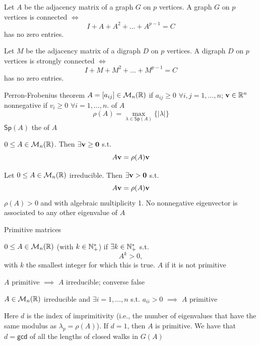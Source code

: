 \documentclass[aspectratio=43]{beamer}
\begin{document}
\begin{frame}
	\begin{theorem}
		Let $A$ be the adjacency matrix of a graph $G$ on $p$ vertices. 
		A graph $G$ on $p$ vertices is connected $\iff$ $$I+A+A^2+\dots+A^{p-1}=C$$
		has no zero entries.
	\end{theorem}
	\begin{theorem}
		Let $M$ be the adjacency matrix of a digraph $D$ on $p$ vertices. 
		A digraph $D$ on $p$ vertices is strongly connected $\iff$ $$I+M+M^2+\dots+M^{p-1}=C$$
		has no zero entries.
	\end{theorem}
\end{frame}


\begin{frame}{Perron-Frobenius theorem}
\vfill
$A=[a_{ij}]\in\mathcal{M}_n(\mathbb{R})$  if $a_{ij}\geq 0$ $\forall i,j=1,\ldots,n$; $\mathbf{v}\in\mathbb{R}^n$ nonnegative if $v_i\geq 0$ $\forall i=1,\ldots,n$.   of $A$
\[
\rho(A) = \max_{\lambda\in\mathsf{Sp}(A)}\{|\lambda|\}
\]
$\mathsf{Sp}(A)$ the  of $A$
\vfill
\begin{theorem}
$0\leq A\in\mathcal{M}_n(\mathbb{R})$. Then $\exists\bv\geq\b0$ s.t. 
\[
	A\mathbf{v}=\rho(A)\mathbf{v}
\]
\end{theorem}
\vfill

\begin{theorem}
	\label{th:PF}
	Let $0\leq A\in \mathcal{M}_n(\mathbb{R})$ irreducible. Then $\exists\bv>\b0$ s.t.
	\[
		A\mathbf{v}=\rho(A)\mathbf{v}
	\]
	$\rho(A)>0$ and with algebraic multiplicity 1.
	No nonnegative eigenvector is associated to any other eigenvalue of $A$
\end{theorem}
\end{frame}



\begin{frame}{Primitive matrices}
\begin{definition}
$0\leq A\in\mathcal{M}_n(\mathbb{R})$  (with  $k\in \mathbb{N}_{+}^{*}$) if $\exists k\in \mathbb{N}_{+}^{*}$ s.t.
\[
A^k>0,
\]
with $k$ the smallest integer for which this is true.
$A$  if it is not primitive
\end{definition}
\vfill
$A$ primitive $\implies$ $A$ irreducible; converse false
\vfill
\begin{theorem}
	$A\in\mathcal{M}_n(\mathbb{R})$ irreducible and $\exists i=1,\ldots,n$ s.t. $a_{ii}>0$ $\implies$ $A$ primitive
\end{theorem}
\vfill
Here $d$ is the index of imprimitivity (i.e., the number of eigenvalues that have the same modulus as $\lambda_p=\rho(A)$). If $d=1$, then $A$ is primitive. We have that $d=\mathsf{gcd}$ of all the lengths of closed walks in $G(A)$
\end{frame}
\end{document}

